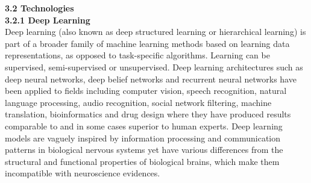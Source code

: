 \documentclass[12pt, English]{article}
\begin{document}
\newpage
\textbf{3.2 Technologies}\\
\textbf{3.2.1 Deep Learning}\\
Deep learning (also known as deep structured learning or hierarchical learning) is
part of a broader family of machine learning methods based on learning data representations, as
opposed to task-specific algorithms. Learning can be supervised,
semi-supervised or unsupervised. Deep learning architectures such as deep neural
networks, deep belief networks and recurrent neural networks have been applied to
fields including computer vision, speech recognition, natural language processing, audio recognition,
social network filtering, machine translation, bioinformatics and drug
design where they have produced results comparable to and in some cases superior to
human experts. Deep learning models are vaguely inspired by information processing
and communication patterns in biological nervous systems yet have various differences
from the structural and functional properties of biological brains, which make them
incompatible with neuroscience evidences.\\
\end{document}
